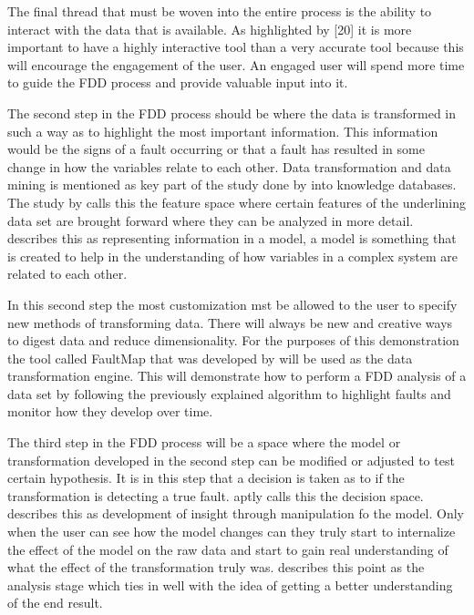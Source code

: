 The final thread that must be woven into the entire process is the ability to interact with the data that is available. As highlighted by [20] it is more important to have a highly interactive tool than a very accurate tool because this will encourage the engagement of the user. An engaged user will spend more time to guide the FDD process and provide valuable input into it.

The second step in the FDD process should be where the data is transformed in such a way as to highlight the most important information. This information would be the signs of a fault occurring or that a fault has resulted in some change in how the variables relate to each other. Data transformation and data mining is mentioned as key part of the study done by \cite{fayyad1996data} into knowledge databases. The study by \cite{venkatasubramanian2003review} calls this the feature space where certain features of the underlining data set are brought forward where they can be analyzed in more detail. \cite{pirolli2005sensemaking} describes this as representing information in a model, a model is something that is created to help in the understanding of how variables in a complex system are related to each other.

In this second step the most customization mst be allowed to the user to specify new methods of transforming data. There will always be new and creative ways to digest data and reduce dimensionality. For the purposes of this demonstration the tool called FaultMap that was developed by \cite{streicher2019plant} will be used as the data transformation engine. This will demonstrate how to perform a FDD analysis of a data set by following the previously explained algorithm to highlight faults and monitor how they develop over time.

The third step in the FDD process will be a space where the model or transformation developed in the second step can be modified or adjusted to test certain hypothesis. It is in this step that a decision is taken as to if the transformation is detecting a true fault. \cite{venkatasubramanian2003review} aptly calls this the decision space. \cite{pirolli2005sensemaking} describes this as development of insight through manipulation fo the model. Only when the user can see how the model changes can they truly start to internalize the effect of the model on the raw data and start to gain real understanding of what the effect of the transformation truly was. \cite{mahyar2010closer} describes this point as the analysis stage which ties in well with the idea of getting a better understanding of the end result.

